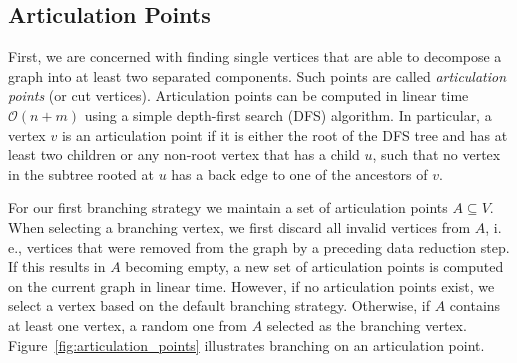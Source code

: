 \documentclass[a4paper,UKenglish,cleveref, autoref, thm-restate]{lipics-v2021}
\newcommand{\ie}{i.\,e.,\xspace}
\begin{document}
\subsection{Articulation Points}
First, we are concerned with finding single vertices that are able to decompose a graph into at least two separated components.
Such points are called \emph{articulation points} (or cut vertices).
Articulation points can be computed in linear time $\mathcal{O}(n+m)$ using a simple depth-first search (DFS) algorithm.
In particular, a vertex $v$ is an articulation point if it is either the root of
the DFS tree and has at least two children or any non-root vertex that has a child $u$, such that no vertex in
the subtree rooted at $u$ has a back edge to one of the ancestors of
$v$.

For our first branching strategy we maintain a set of articulation points $A \subseteq V$.
When selecting a branching vertex, we first discard all invalid vertices from
$A$, \ie vertices that were removed from the graph by a preceding data reduction step.
If this results in $A$ becoming empty, a new set of articulation points is computed on the current graph in linear time.
However, if no articulation points exist, we select a vertex based on the default branching strategy.
Otherwise, if $A$ contains at least one vertex, a random one from $A$ selected as the branching
vertex. Figure~\ref{fig:articulation_points} illustrates branching on an
articulation point.
\end{document}
